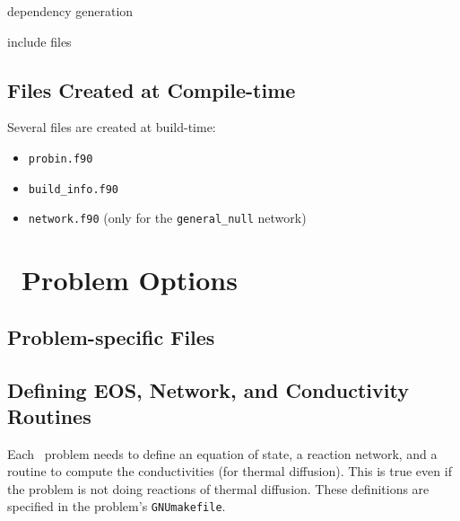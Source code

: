 dependency generation

include files

\subsection{Files Created at Compile-time}

Several files are created at build-time:
\begin{itemize}
\item {\tt probin.f90}

\item {\tt build\_info.f90}

\item {\tt network.f90} (only for the {\tt general\_null} network)
\end{itemize}



\section{\maestro\ Problem Options}

\subsection{Problem-specific Files}
\label{sec:make:otherfiles}


\subsection{Defining EOS, Network, and Conductivity Routines}

Each \maestro\ problem needs to define an equation of state, a
reaction network, and a routine to compute the conductivities (for
thermal diffusion).  This is true even if the problem is not doing
reactions of thermal diffusion.  These definitions are specified
in the problem's {\tt GNUmakefile}.

